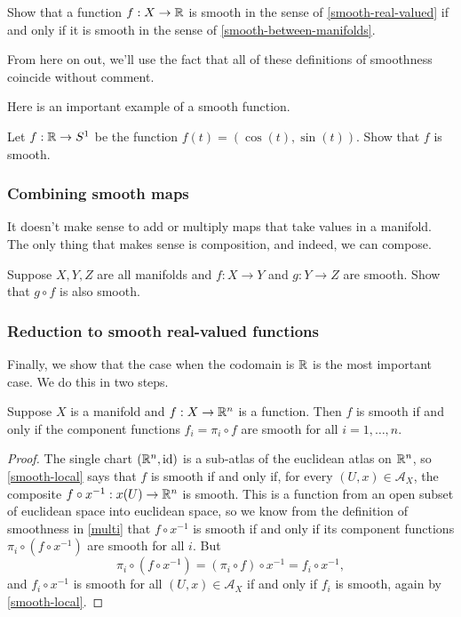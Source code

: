 \begin{exercise}
	Show that a function $f : X \to \mathbb{R}$ is smooth in the sense of \cref{smooth-real-valued} if and only if it is smooth in the sense of \cref{smooth-between-manifolds}.
\end{exercise}

From here on out, we'll use the fact that all of these definitions of smoothness coincide without comment. 

Here is an important example of a smooth function. 

\begin{exercise} \label{universal-cover-circle}
	Let $f : \mathbb{R} \to S^1$ be the function $f(t) = (\cos(t), \sin(t))$. Show that $f$ is smooth. 
\end{exercise}


\subsubsection*{Combining smooth maps}

It doesn't make sense to add or multiply maps that take values in a manifold. The only thing that makes sense is composition, and indeed, we can compose. 

\begin{exercise} \label{smooth-stable-composite}
	Suppose $X, Y, Z$ are all manifolds and $f : X \to Y$ and $g : Y \to Z$ are smooth. Show that $g \circ f$ is also smooth. 
\end{exercise}  

\subsubsection*{Reduction to smooth real-valued functions}

Finally, we show that the case when the codomain is $\mathbb{R}$ is the most important case. We do this in two steps. 

\begin{proposition} \label{euclidean-valued-smooth-iff-components-smooth}
	Suppose $X$ is a manifold and $f : X \to \mathbb{R}^n$ is a function. Then $f$ is smooth if and only if the component functions $f_i = \pi_i \circ f$ are smooth for all $i = 1, \dotsc, n$. 
\end{proposition}

\begin{proof}
	The single chart $(\mathbb{R}^n, \mathrm{id})$ is a sub-atlas of the euclidean atlas on $\mathbb{R}^n$, so \cref{smooth-local} says that $f$ is smooth if and only if, for every $(U, x) \in \mathscr{A}_X$, the composite $f \circ x^{-1} : x(U) \to \mathbb{R}^n$ is smooth. This is a function from an open subset of euclidean space into euclidean space, so we know from the definition of smoothness in \cref{multi} that $f \circ x^{-1}$ is smooth if and only if its component functions $\pi_i \circ (f \circ x^{-1})$ are smooth for all $i$. But 
	\[ \pi_i \circ (f \circ x^{-1}) = (\pi_i \circ f) \circ x^{-1} = f_i \circ x^{-1}, \]
	and $f_i \circ x^{-1}$ is smooth for all $(U, x) \in \mathscr{A}_X$ if and only if $f_i$ is smooth, again by \cref{smooth-local}. 
\end{proof}

